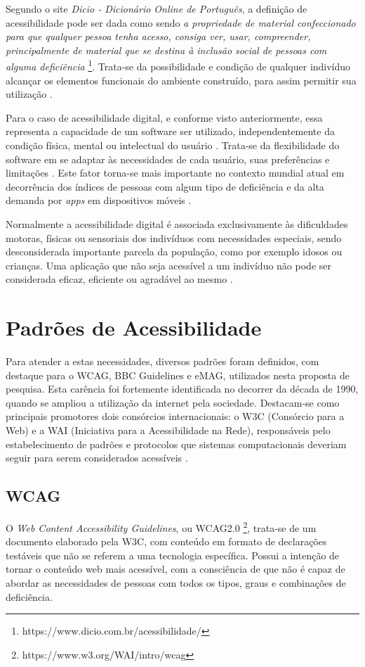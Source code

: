 
Segundo o site \textit{Dicio - Dicionário Online de Português}, a definição de acessibilidade pode ser dada como sendo \textit{a propriedade de material confeccionado para que qualquer pessoa tenha acesso, consiga ver, usar, compreender, principalmente de material que se destina à inclusão social de pessoas com alguma deficiência} \footnote{https://www.dicio.com.br/acessibilidade/}. Trata-se da possibilidade e condição de qualquer indivíduo alcançar os elementos funcionais do ambiente construído, para assim permitir sua utilização \cite{camilamaster}.

Para o caso de acessibilidade digital, e conforme visto anteriormente, essa representa a capacidade de um software ser utilizado, independentemente da condição física, mental ou intelectual do usuário \cite{w3cwai}. Trata-se da flexibilidade do software em se adaptar às necessidades de cada usuário, suas preferências e limitações \cite{camilamaster}. Este fator torna-se mais importante no contexto mundial atual em decorrência dos índices de pessoas com algum tipo de deficiência e da alta demanda por \textit{apps} em dispositivos móveis \cite{storeanalysis}.

Normalmente a acessibilidade digital é associada exclusivamente às dificuldades motoras, físicas ou sensoriais dos indivíduos com necessidades especiais, sendo desconsiderada importante parcela da população, como por exemplo idosos ou crianças. Uma aplicação que não seja acessível a um indivíduo não pode ser considerada eficaz, eficiente ou agradável ao mesmo \cite{santarosa}.

\section{Padrões de Acessibilidade}
Para atender a estas necessidades, diversos padrões foram definidos, com destaque para o WCAG, BBC Guidelines e eMAG, utilizados nesta proposta de pesquisa. Esta carência foi fortemente identificada no decorrer da década de 1990, quando se ampliou a utilização da internet pela sociedade. Destacam-se como principais promotores dois consórcios internacionais: o W3C (Consórcio para a Web) e a WAI (Iniciativa para a Acessibilidade na Rede), responsáveis pelo estabelecimento de padrões e protocolos que sistemas computacionais deveriam seguir para serem considerados acessíveis \cite{passerino}.

\subsection{WCAG}
O \textit{Web Content Accessibility Guidelines}, ou WCAG2.0 \footnote{https://www.w3.org/WAI/intro/wcag}, trata-se de um documento elaborado pela W3C, com conteúdo em formato de declarações testáveis que não se referem a uma tecnologia específica. Possui a intenção de tornar o conteúdo web mais acessível, com a consciência de que não é capaz de abordar as necessidades de pessoas com todos os tipos, graus e combinações de deficiência.


